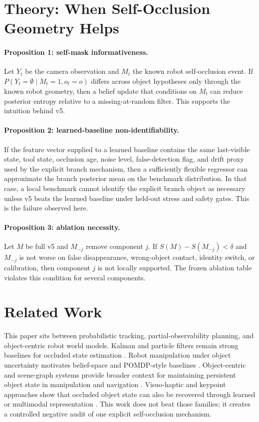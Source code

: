 \documentclass{article}
\begin{document}
\section{Theory: When Self-Occlusion Geometry Helps}
\paragraph{Proposition 1: self-mask informativeness.}
Let $Y_t$ be the camera observation and $M_t$ the known robot self-occlusion event.
If $P(Y_t=\emptyset\mid M_t=1,o_t=o)$ differs across object hypotheses only through the known robot geometry, then a belief update that conditions on $M_t$ can reduce posterior entropy relative to a missing-at-random filter.
This supports the intuition behind v5.

\paragraph{Proposition 2: learned-baseline non-identifiability.}
If the feature vector supplied to a learned baseline contains the same last-visible state, tool state, occlusion age, noise level, false-detection flag, and drift proxy used by the explicit branch mechanism, then a sufficiently flexible regressor can approximate the branch posterior mean on the benchmark distribution.
In that case, a local benchmark cannot identify the explicit branch object as necessary unless v5 beats the learned baseline under held-out stress and safety gates.
This is the failure observed here.

\paragraph{Proposition 3: ablation necessity.}
Let $M$ be full v5 and $M_{-j}$ remove component $j$.
If $S(M)-S(M_{-j})<\delta$ and $M_{-j}$ is not worse on false disappearance, wrong-object contact, identity switch, or calibration, then component $j$ is not locally supported.
The frozen ablation table violates this condition for several components.

\section{Related Work}
This paper sits between probabilistic tracking, partial-observability planning, and object-centric robot world models.
Kalman and particle filters remain strong baselines for occluded state estimation \citep{kalman1960new,gordon1993novel,thrun2005probabilistic}.
Robot manipulation under object uncertainty motivates belief-space and POMDP-style baselines \citep{pajarinen2023pomdp}.
Object-centric and scene-graph systems provide broader context for maintaining persistent object state in manipulation and navigation \citep{min2025asimo,loo2025open,honerkamp2024language,ren2024object,liu2026oawam,daniel2026latent}.
Visuo-haptic and keypoint approaches show that occluded object state can also be recovered through learned or multimodal representation \citep{rustler2023shape,hartz2022keypoints}.
This work does not beat those families; it creates a controlled negative audit of one explicit self-occlusion mechanism.
\end{document}
